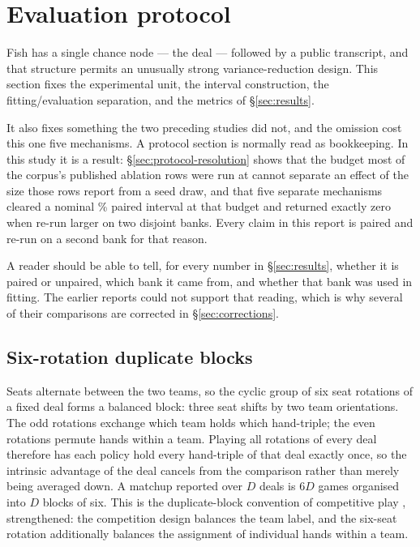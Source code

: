 \section{Evaluation protocol}
\label{sec:protocol}

Fish has a single chance node --- the deal --- followed by a public transcript,
and that structure permits an unusually strong variance-reduction design. This
section fixes the experimental unit, the interval construction, the
fitting/evaluation separation, and the metrics of \S\ref{sec:results}.

It also fixes something the two preceding studies did not, and the omission cost
this one five mechanisms. A protocol section is normally read as bookkeeping. In
this study it is a result: \S\ref{sec:protocol-resolution} shows that the
budget most of the corpus's published ablation rows were run at cannot separate
an effect of the size those rows report from a seed draw, and that five separate
mechanisms cleared a nominal \vsixBootAlpha{}\% paired interval at that budget and returned
exactly zero when re-run larger on two disjoint banks. Every claim in this report
is paired and re-run on a second bank for that reason.

A reader should be able to tell, for every number in \S\ref{sec:results}, whether
it is paired or unpaired, which bank it came from, and whether that bank was used
in fitting. The earlier reports could not support that reading, which is why
several of their comparisons are corrected in \S\ref{sec:corrections}.

\subsection{Six-rotation duplicate blocks}
\label{sec:protocol-blocks}

Seats alternate between the two teams, so the cyclic group of six seat rotations
of a fixed deal forms a balanced block: three seat shifts by two team
orientations. The odd rotations exchange which team holds which hand-triple; the
even rotations permute hands within a team. Playing all \vsixRotations{}
rotations of every deal therefore has each policy hold every hand-triple of that
deal exactly once, so the intrinsic advantage of the deal cancels from the
comparison rather than merely being averaged down. A matchup reported over $D$
deals is $6D$ games organised into $D$ blocks of six. This is the duplicate-block
convention of competitive play \cite{acpc}, strengthened: the competition design
balances the team label, and the six-seat rotation additionally balances the
assignment of individual hands within a team.


